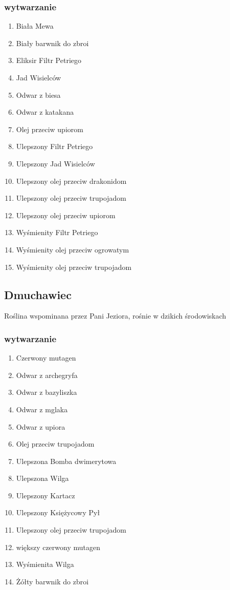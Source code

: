 \documentclass[12pt, letterpaper, titlepage]{article}
\begin{document}
\subsubsection{wytwarzanie}
\begin{enumerate}
\item Biała Mewa
\item Biały barwnik do zbroi
\item Eliksir Filtr Petriego
\item Jad Wisielców
\item Odwar z biesa
\item Odwar z katakana
\item Olej przeciw upiorom
\item Ulepszony Filtr Petriego
\item Ulepszony Jad Wisielców
\item Ulepszony olej przeciw drakonidom
\item Ulepszony olej przeciw trupojadom
\item Ulepszony olej przeciw upiorom
\item Wyśmienity Filtr Petriego
\item Wyśmienity olej przeciw ogrowatym
\item Wyśmienity olej przeciw trupojadom
\end{enumerate} 
\newpage
\subsection{Dmuchawiec}
Roślina wspominana przez Pani Jeziora, rośnie w dzikich środowiskach
\subsubsection{wytwarzanie}
\begin{enumerate}
\item Czerwony mutagen
\item Odwar z archegryfa
\item Odwar z bazyliszka
\item Odwar z mglaka
\item Odwar z upiora
\item Olej przeciw trupojadom
\item Ulepszona Bomba dwimerytowa
\item Ulepszona Wilga
\item Ulepszony Kartacz
\item Ulepszony Księżycowy Pył
\item Ulepszony olej przeciw trupojadom
\item większy czerwony mutagen
\item Wyśmienita Wilga
\item Żółty barwnik do zbroi
\end{enumerate}
\newpage
\end{document}

